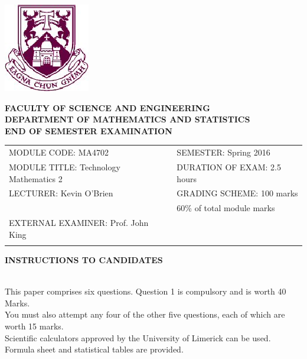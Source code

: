 ﻿ \documentclass[a4paper,12pt]{article}
\begin{document}
 	
 	\begin{center}
 		\includegraphics[scale=0.60]{shieldtransparent2}
 	\end{center}
 	
 	\begin{center}
 \vspace{1cm}
 \large \bf {FACULTY OF SCIENCE AND ENGINEERING} \\[0.5cm]
 \normalsize DEPARTMENT OF MATHEMATICS AND STATISTICS \\[1.25cm]
 \large \bf {END OF SEMESTER EXAMINATION} \\[1.5cm]
 	\end{center}
 	
 	\begin{tabular}{ll}
 		MODULE CODE: MA4702 & SEMESTER: Spring 2016\\[1cm]
 		MODULE TITLE: Technology Mathematics 2 & DURATION OF EXAM: 2.5 hours \\[1cm]
 		LECTURER: Kevin O'Brien & GRADING SCHEME: 100 marks\\
 		& \phantom{GRADING SCHEME:} \footnotesize {60\% of total module marks}   \\[0.8cm]
 		EXTERNAL EXAMINER: Prof. John King & \\[1cm]
 		\\[1cm]
 	\end{tabular}
 	\begin{center}
 		{\bf INSTRUCTIONS TO CANDIDATES}
 	\end{center}
 	
 	{\noindent \\ This paper comprises six questions. Question 1 is compulsory and is worth 40 Marks.\\  You must also attempt any four of the other five questions, each of which are worth 15 marks.
 		\\ Scientific calculators approved by the University of Limerick can be used. 
 		\\ Formula sheet and statistical tables are provided.
 	}
 	\normalsize
 	\newpage
 	\large
\end{document}
